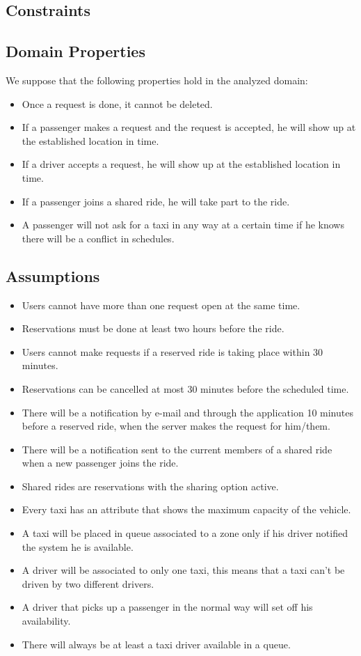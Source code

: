 \subsection{Constraints}

\subsection{Domain Properties}
We suppose that the following properties hold in the analyzed domain:
	\begin{itemize}
		\item Once a request is done, it cannot be deleted.
		\item If a passenger makes a request and the request is accepted, he will show up at the established location in time.
		\item If a driver accepts a request, he will show up at the established location in time.
		\item If a passenger joins a shared ride, he will take part to the ride.
		\item A passenger will not ask for a taxi in any way at a certain time if he knows there will be a conflict in schedules.
	\end{itemize}
	
\subsection{Assumptions}
	\begin{itemize}
		\item Users cannot have more than one request open at the same time.
		\item Reservations must be done at least two hours before the ride.
		\item Users cannot make requests if a reserved ride is taking place within 30 minutes.
		\item Reservations can be cancelled at most 30 minutes before the scheduled time.
		\item There will be a notification by e-mail and through the application 10 minutes before a reserved ride, when the server makes the request for him/them.
		\item There will be a notification sent to  the current members of a shared ride when a new passenger joins the ride.
		\item Shared rides are reservations with the sharing option active.
		\item Every taxi has an attribute that shows the maximum capacity of the vehicle.
		\item A taxi will be placed in queue associated to a zone only if his driver notified the system he is available.
		\item A driver will be associated to only one taxi, this means that a taxi can't be driven by two different drivers.
		\item A driver that picks up a passenger in the normal way will set off his availability.
		\item There will always be at least a taxi driver available in a queue.
	\end{itemize}

			
